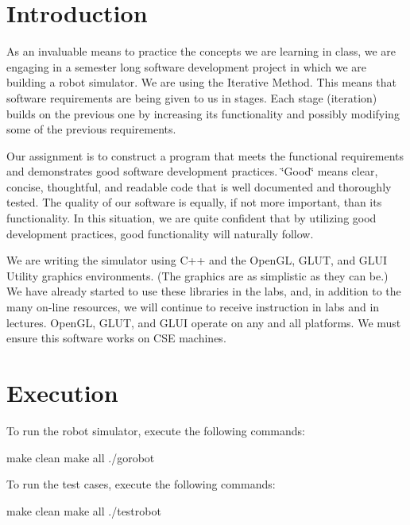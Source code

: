 \hypertarget{index_intro_sec}{}\section{Introduction}\label{index_intro_sec}
As an invaluable means to practice the concepts we are learning in class, we are engaging in a semester long software development project in which we are building a robot simulator. We are using the Iterative Method. This means that software requirements are being given to us in stages. Each stage (iteration) builds on the previous one by increasing its functionality and possibly modifying some of the previous requirements.

Our assignment is to construct a program that meets the functional requirements and demonstrates good software development practices. \char`\"{}\-Good\char`\"{} means clear, concise, thoughtful, and readable code that is well documented and thoroughly tested. The quality of our software is equally, if not more important, than its functionality. In this situation, we are quite confident that by utilizing good development practices, good functionality will naturally follow.

We are writing the simulator using C++ and the Open\-G\-L, G\-L\-U\-T, and G\-L\-U\-I Utility graphics environments. (The graphics are as simplistic as they can be.) We have already started to use these libraries in the labs, and, in addition to the many on-\/line resources, we will continue to receive instruction in labs and in lectures. Open\-G\-L, G\-L\-U\-T, and G\-L\-U\-I operate on any and all platforms. We must ensure this software works on C\-S\-E machines.\hypertarget{index_Execution}{}\section{Execution}\label{index_Execution}
To run the robot simulator, execute the following commands\-:


\begin{DoxyCode}
make clean
make all
./gorobot
\end{DoxyCode}


To run the test cases, execute the following commands\-:


\begin{DoxyCode}
make clean
make all
./testrobot
\end{DoxyCode}
 